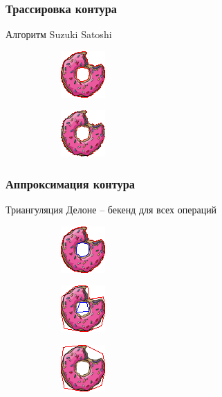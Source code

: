 \documentclass[10pt, unicode]{beamer}
\begin{document}
    \begin{frame}
        \frametitle{Трассировка контура}
        Алгоритм Suzuki Satoshi\cite{SuzukiAlgorithm}
        \begin{figure}[H]
            \centering
            \begin{subfigure}[l]{0.50\linewidth}
                \centering
                \includegraphics[scale=2]{donutpixel_contour_none.png}
            \end{subfigure}
            \begin{subfigure}{0.49\linewidth}
                \centering
                \includegraphics[scale=2]{donutpixel_contour_simple.png}
            \end{subfigure}
        \end{figure}
    \end{frame}
    \begin{frame}
        \frametitle{Аппроксимация контура}
        Триангуляция Делоне\cite{Delaunay} -- бекенд для всех операций
        \begin{figure}[H]
            \centering
            \begin{subfigure}[l]{0.33\linewidth}
                \centering
                \includegraphics[scale=1.5]{donutpixel_approx_start.png}
            \end{subfigure}
            \begin{subfigure}{0.33\linewidth}
                \centering
                \includegraphics[scale=1.5]{donutpixel_approx_mid.png}
            \end{subfigure}\begin{subfigure}{0.33\linewidth}
                \centering
                \includegraphics[scale=1.5]{donutpixel_approx_end.png}
            \end{subfigure}
        \end{figure}
    \end{frame}
\end{document}
